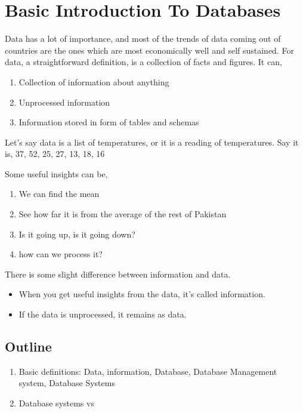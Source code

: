 \documentclass{article}
\begin{document}
    \tableofcontents
    
    \section{Basic Introduction To Databases}

    Data has a lot of importance, and most of the trends of data coming out of countries are the ones which are most economically well and self sustained.
    For data, a straightforward definition, is a collection of facts and figures.
    It can,

    \begin{enumerate}
        \item Collection of information about anything
        \item Unprocessed information
        \item Information stored in form of tables and schemas
    \end{enumerate}

    Let's say data is a list of temperatures, or it is a reading of temperatures. Say it is,
    37, 52, 25, 27, 13, 18, 16

    Some useful insights can be,
    \begin{enumerate}
        \item We can find the mean
        \item See how far it is from the average of the rest of Pakistan
        \item Is it going up, is it going down?
        \item how can we process it?
    \end{enumerate}

    There is some slight difference between information and data.
    
    \begin{itemize}
        \item When you get useful insights from the data, it's called information.
        \item If the data is unprocessed, it remains as data.
    \end{itemize}

    \subsection{Outline}

    \begin{enumerate}
        \item Basic definitions: Data, information, Database, Database Management system, Database Systems
        \item Database systems vs 
    \end{enumerate}
\end{document}
